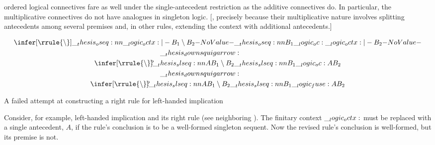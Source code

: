  ordered logical connectives fare as well under the single-antecedent restriction as the additive connectives do.
In particular, the multiplicative connectives do not have analogues in singleton logic.
[, precisely because their multiplicative nature involves splitting antecedents among several premises and, in other rules, extending the context with additional antecedents.]

\begin{marginfigure}[12\baselineskip]
  \normalsize
  \begin{gather*}
    \infer[\rrule{\limp}]{\oseq{\octx |- B_1 \limp B_2}}{
      \oseq{B_1 \oc \octx |- B_2}}
    \\
    \mathord{\downsquigarrow}\hspace{5pt}\hphantom{\rrule{\limp}}
    \\
    \infer[\rrule{\limp}\mathrlap{?}]{\slseq{A |- B_1 \limp B_2}}{
      \slseq{B_1 \oc A |- B_2}}
    \\
    \mathord{\downsquigarrow}\hspace{5pt}\hphantom{\rrule{\limp}}
    \\
    \infer[\rrule{\limp}\mathrlap{?}]{\slseq{A |- B_1 \limp B_2}}{
      \slseq{B_1 \fuse A |- B_2}}
  \end{gather*}
  \caption{A failed attempt at constructing a right rule for left-handed implication}\label{fig:singleton-logic:seq-calc:derive-limp}
\end{marginfigure}
%
Consider, for example, left-handed implication and its right rule (see neighboring ).
The finitary context $\__logic_octx:$ must be replaced with a single antecedent, $A$, if the rule's conclusion is to be a well-formed singleton sequent.
Now the revised rule's conclusion is well-formed, but its premise is not.

